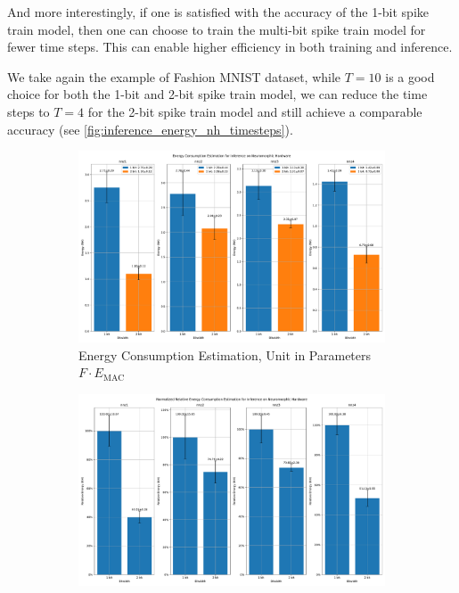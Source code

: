         And more interestingly, if one is satisfied with the accuracy of the 1-bit spike train model, then one can choose to train the multi-bit spike train model for fewer time steps. This can enable higher efficiency in both training and inference. 

        We take again the example of Fashion MNIST dataset, while $T=10$ is a good choice for both the 1-bit and 2-bit spike train model, we can reduce the time steps to $T=4$ for the 2-bit spike train model and still achieve a comparable accuracy (see \ref{fig:inference_energy_nh_timesteps}). 
        \begin{figure}[!htpb]
            \centering
            \begin{subfigure}[H]{0.48\textwidth}
                \includegraphics[width=\textwidth]{../timesteps/FashionMNIST/plots/fashionmnist_test_energy_nh.pdf}
                \caption{Energy Consumption Estimation, Unit in Parameters $F\cdot E_{\text{MAC}}$}
            \end{subfigure}
            \hfill
            \begin{subfigure}[H]{0.48\textwidth}
                \includegraphics[width=\textwidth]{../timesteps/FashionMNIST/plots/fashionmnist_test_relative_energy_nh.pdf}

\end{subfigure}
\end{figure}
